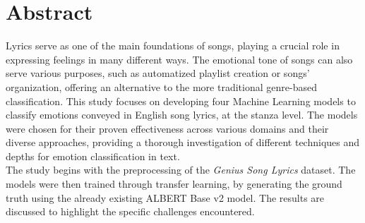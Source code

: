 \firstchapter
\chapter*{Abstract}
\label{ch:abstract}
Lyrics serve as one of the main foundations of songs, playing a crucial role in expressing feelings in many different ways.
The emotional tone of songs can also serve various purposes, such as automatized playlist creation or songs' organization,
offering an alternative to the more traditional genre-based classification. This study focuses on developing four Machine Learning models
to classify emotions conveyed in English song lyrics, at the stanza level.
The models were chosen for their proven effectiveness across various domains and
their diverse approaches, providing a thorough investigation of different
techniques and depths for emotion classification in text.\\
The study begins with the preprocessing of the \textit{Genius Song Lyrics}\textsuperscript{\cite{geniusdataset}} dataset.
The models were then trained through transfer learning, by generating the ground
truth using the already existing ALBERT Base v2 model.
The results are discussed to highlight the specific challenges encountered.